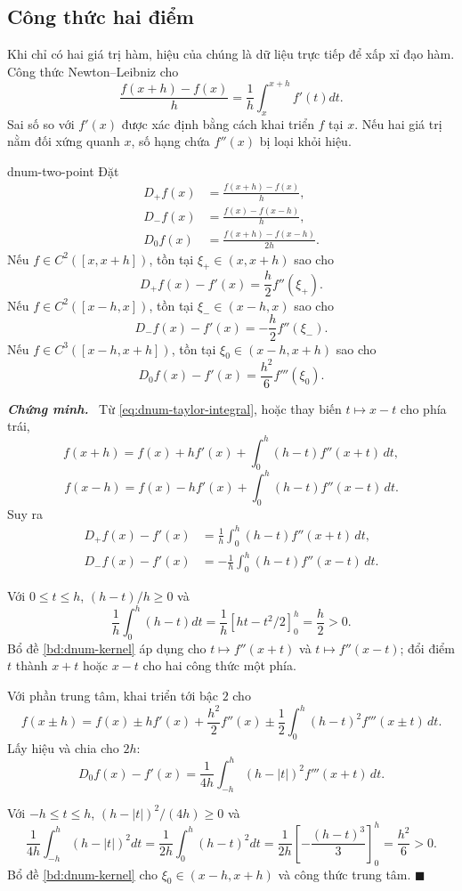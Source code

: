 \documentclass[12pt,a4paper,oneside]{book}
\numberwithin{algorithm}{chapter}
\theoremstyle{definition}
\newenvironment{chungminh}{\par\medskip\noindent\textbf{\textit{\color{mainblue}Chứng minh.}}\ }{\hfill$\blacksquare$\par\medskip}
\begin{document}
\subsection{Công thức hai điểm}
Khi chỉ có hai giá trị hàm, hiệu của chúng là dữ liệu trực tiếp để xấp xỉ đạo hàm. Công thức Newton--Leibniz cho
\[
 \frac{f(x+h)-f(x)}h=\frac1h\int_x^{x+h}f'(t)dt.
\]
Sai số so với $f'(x)$ được xác định bằng cách khai triển $f$ tại $x$. Nếu hai giá trị nằm đối xứng quanh $x$, số hạng chứa $f''(x)$ bị loại khỏi hiệu.
\begin{dinhly}{}{dnum-two-point}
Đặt
\[
\begin{aligned}
 D_+f(x)&=\frac{f(x+h)-f(x)}h,\\
 D_-f(x)&=\frac{f(x)-f(x-h)}h,\\
 D_0f(x)&=\frac{f(x+h)-f(x-h)}{2h}.
\end{aligned}
\]
Nếu $f\in C^2([x,x+h])$, tồn tại $\xi_+\in(x,x+h)$ sao cho
\[
 D_+f(x)-f'(x)=\frac h2 f''(\xi_+).
\]
Nếu $f\in C^2([x-h,x])$, tồn tại $\xi_-\in(x-h,x)$ sao cho
\[
 D_-f(x)-f'(x)=-\frac h2 f''(\xi_-).
\]
Nếu $f\in C^3([x-h,x+h])$, tồn tại $\xi_0\in(x-h,x+h)$ sao cho
\[
 D_0f(x)-f'(x)=\frac{h^2}{6}f'''(\xi_0).
\]
\end{dinhly}
\begin{chungminh}
Từ \eqref{eq:dnum-taylor-integral}, hoặc thay biến $t\mapsto x-t$ cho phía trái,
\[
 f(x+h)=f(x)+hf'(x)+\int_0^h(h-t)f''(x+t)\,dt,
\]
\[
 f(x-h)=f(x)-hf'(x)+\int_0^h(h-t)f''(x-t)\,dt.
\]
Suy ra
\[
 \begin{aligned}
 D_+f(x)-f'(x)&=\frac1h\int_0^h(h-t)f''(x+t)\,dt,\\
 D_-f(x)-f'(x)&=-\frac1h\int_0^h(h-t)f''(x-t)\,dt.
 \end{aligned}
\]

Với $0\leq t\leq h$, $(h-t)/h\geq0$ và
\[
 \frac1h\int_0^h(h-t)dt=\frac1h[ht-t^2/2]_0^h=\frac h2>0.
\]
Bổ đề \ref{bd:dnum-kernel} áp dụng cho $t\mapsto f''(x+t)$ và $t\mapsto f''(x-t)$; đổi điểm $t$ thành $x+t$ hoặc $x-t$ cho hai công thức một phía.

Với phần trung tâm, khai triển tới bậc $2$ cho
\[
 f(x\pm h)=f(x)\pm hf'(x)+\frac{h^2}{2}f''(x)
 \pm\frac12\int_0^h(h-t)^2f'''(x\pm t)\,dt.
\]
Lấy hiệu và chia cho $2h$:
\[
 D_0f(x)-f'(x)=\frac1{4h}\int_{-h}^h(h-|t|)^2f'''(x+t)\,dt.
\]

Với $-h\leq t\leq h$, $(h-|t|)^2/(4h)\geq0$ và
\[
 \frac1{4h}\int_{-h}^h(h-|t|)^2dt
 =\frac1{2h}\int_0^h(h-t)^2dt
 =\frac1{2h}\left[-\frac{(h-t)^3}{3}\right]_0^h=\frac{h^2}{6}>0.
\]
Bổ đề \ref{bd:dnum-kernel} cho $\xi_0\in(x-h,x+h)$ và công thức trung tâm.
\end{chungminh}
\end{document}
